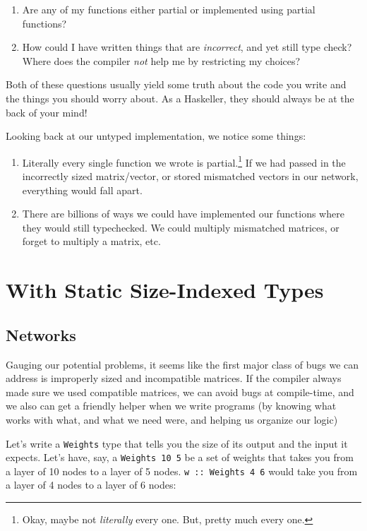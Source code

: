 \documentclass[]{article}
\begin{document}
\begin{enumerate}
\def\labelenumi{\arabic{enumi}.}
\tightlist
\item
  Are any of my functions either partial or implemented using partial
  functions?
\item
  How could I have written things that are \emph{incorrect}, and yet
  still type check? Where does the compiler \emph{not} help me by
  restricting my choices?
\end{enumerate}

Both of these questions usually yield some truth about the code you
write and the things you should worry about. As a Haskeller, they should
always be at the back of your mind!

Looking back at our untyped implementation, we notice some things:

\begin{enumerate}
\def\labelenumi{\arabic{enumi}.}
\tightlist
\item
  Literally every single function we wrote is partial.\footnote{Okay,
    maybe not \emph{literally} every one. But, pretty much every one.}
  If we had passed in the incorrectly sized matrix/vector, or stored
  mismatched vectors in our network, everything would fall apart.
\item
  There are billions of ways we could have implemented our functions
  where they would still typechecked. We could multiply mismatched
  matrices, or forget to multiply a matrix, etc.
\end{enumerate}

\section{With Static Size-Indexed
Types}\label{with-static-size-indexed-types}

\subsection{Networks}\label{networks}

Gauging our potential problems, it seems like the first major class of
bugs we can address is improperly sized and incompatible matrices. If
the compiler always made sure we used compatible matrices, we can avoid
bugs at compile-time, and we also can get a friendly helper when we
write programs (by knowing what works with what, and what we need were,
and helping us organize our logic)

Let's write a \texttt{Weights} type that tells you the size of its
output and the input it expects. Let's have, say, a
\texttt{Weights\ 10\ 5} be a set of weights that takes you from a layer
of 10 nodes to a layer of 5 nodes. \texttt{w\ ::\ Weights\ 4\ 6} would
take you from a layer of 4 nodes to a layer of 6 nodes:
\end{document}
